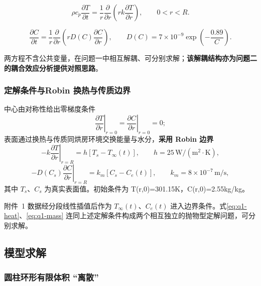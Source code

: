 \begin{equation}
\rho c_p\frac{\partial T}{\partial t}=\frac{1}{r}\frac{\partial}{\partial r}\!\left(rk\frac{\partial T}{\partial r}\right),
\label{eq:q1-heat}
\qquad 0<r<R.
\end{equation}

\begin{equation}
\frac{\partial C}{\partial t}=\frac{1}{r}\frac{\partial}{\partial r}\!\left(rD(C)\frac{\partial C}{\partial r}\right),
\qquad
D(C)=7\times10^{-9}\exp\!\left(-\frac{0.89}{C}\right).
\label{eq:q1-mass}
\end{equation}

\vspace{2em}


两方程不含公共变量，在问题一中相互解耦、可分别求解；\textbf{该解耦结构亦为问题二的耦合效应分析提供对照思路}。

\subsubsection{定解条件与Robin 换热与传质边界}

中心由对称性给出零梯度条件
\begin{equation}
\left.\frac{\partial T}{\partial r}\right|_{r=0}=\left.\frac{\partial C}{\partial r}\right|_{r=0}=0;
\label{eq:q1-center}
\end{equation}
表面通过换热与传质同烘房环境交换能量与水分，\textbf{采用 Robin 边界}
\begin{equation}
-k\left.\frac{\partial T}{\partial r}\right|_{r=R}=h\left[T_s-T_\infty(t)\right],
\qquad h=25\,\mathrm{W/(m^2\cdot K)},
\label{eq:q1-robinT}
\end{equation}
\begin{equation}
-D(C_s)\left.\frac{\partial C}{\partial r}\right|_{r=R}=k_m\left[C_s-C_e(t)\right],
\qquad k_m=8\times10^{-7}\,\mathrm{m/s},
\label{eq:q1-robinC}
\end{equation}
其中 $T_s$、$C_s$ 为真实表面值。初始条件为
T(r,0)=301.15K，C(r,0)=2.55kg/kg。

附件~1 数据经分段线性插值后作为 $T_\infty(t)$、$C_e(t)$ 进入边界条件。式\eqref{eq:q1-heat}、\eqref{eq:q1-mass} 连同上述定解条件构成两个相互独立的抛物型定解问题，可分别求解。


\newpage
\subsection{模型求解}

\subsubsection{圆柱环形有限体积 “离散”}

